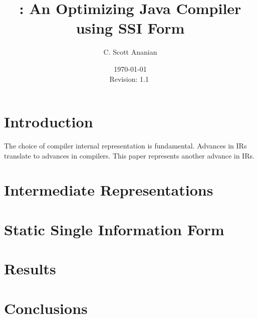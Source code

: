 \documentclass[notitlepage,twoside]{article}
\title{\magic: An Optimizing Java Compiler using SSI Form}
\author{C. Scott Ananian}
\date{\today \\ $ $Revision: 1.1 $ $}
\begin{document}
\pagestyle{myheadings}

\maketitle

\section{Introduction}
The choice of compiler internal representation is fundamental.
Advances in IRs translate to advances in compilers.
This paper represents another advance in IRs.

\section{Intermediate Representations}
\section{Static Single Information Form}

\section{Results}
\section{Conclusions}
\end{document}
